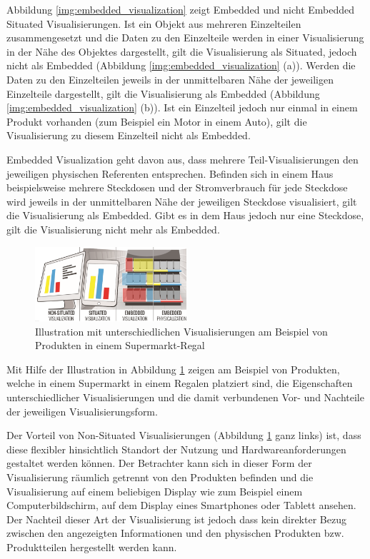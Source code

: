 Abbildung \ref{img:embedded_visualization} zeigt Embedded und nicht Embedded Situated Visualisierungen. \cite[S.~202]{Marriott2018} Ist ein Objekt aus mehreren Einzelteilen 
zusammengesetzt und die Daten zu den Einzelteile werden in einer Visualisierung in der Nähe des Objektes dargestellt, gilt die Visualisierung als Situated, jedoch nicht als Embedded (Abbildung \ref{img:embedded_visualization} (a)).
Werden die Daten zu den Einzelteilen jeweils in der unmittelbaren Nähe der jeweiligen Einzelteile dargestellt, gilt die Visualisierung als Embedded (Abbildung \ref{img:embedded_visualization} (b)). Ist ein Einzelteil jedoch nur einmal in einem Produkt vorhanden (zum Beispiel ein Motor in einem Auto), gilt die Visualisierung zu diesem Einzelteil nicht als Embedded. 

Embedded Visualization geht davon aus, dass mehrere Teil-Visualisierungen den jeweiligen physischen Referenten entsprechen. Befinden sich in einem Haus beispielsweise mehrere Steckdosen und der Stromverbrauch 
für jede Steckdose wird jeweils in der unmittelbaren Nähe der jeweiligen Steckdose visualisiert, gilt die Visualisierung als Embedded. Gibt es in dem Haus jedoch nur eine Steckdose, gilt die Visualisierung nicht mehr als
Embedded.

\vspace{15mm} 
\begin{figure}[H]
	\centering
	\includegraphics[width=0.5\textwidth]{resources/fundamentals/situated_visualization/Illustration_situated_embedded_visualization.png}
	\caption{Illustration mit unterschiedlichen Visualisierungen am Beispiel von Produkten in einem Supermarkt-Regal}
	\label{img:Illustration_situated_embedded_visualization}
\end{figure}

Mit Hilfe der Illustration in Abbildung \ref{img:Illustration_situated_embedded_visualization} zeigen \cite{Willett2017} am Beispiel von Produkten, 
welche in einem Supermarkt in einem Regalen platziert sind, die Eigenschaften unterschiedlicher Visualisierungen und die damit verbundenen Vor- und Nachteile der jeweiligen Visualisierungsform. 

Der Vorteil von Non-Situated Visualisierungen (Abbildung \ref{img:Illustration_situated_embedded_visualization} ganz links) ist, dass diese flexibler hinsichtlich Standort 
der Nutzung und Hardwareanforderungen gestaltet werden können. Der Betrachter kann sich in dieser Form der Visualisierung räumlich getrennt von den Produkten befinden und die Visualisierung 
auf einem beliebigen Display wie zum Beispiel einem Computerbildschirm, auf dem Display eines Smartphones oder Tablett ansehen. Der Nachteil dieser Art der Visualisierung ist jedoch dass kein 
direkter Bezug zwischen den angezeigten Informationen und den physischen Produkten bzw. Produktteilen hergestellt werden kann. 

